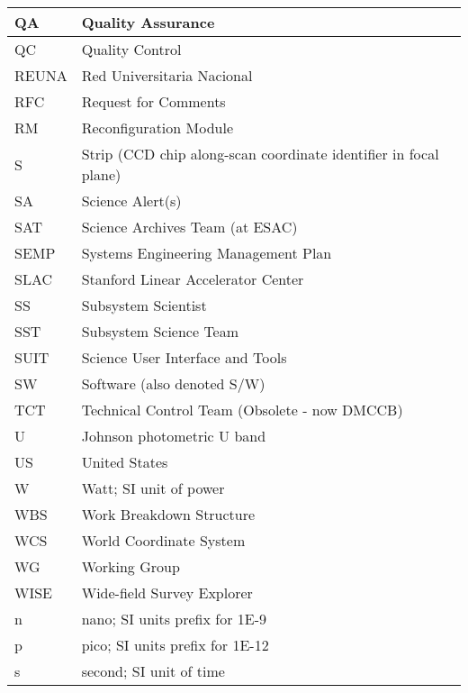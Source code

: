 \begin{longtable}{|l|p{}|}
QA & Quality Assurance \\\hline
QC & Quality Control \\\hline
REUNA & Red Universitaria Nacional \\\hline
RFC & Request for Comments \\\hline
RM & Reconfiguration Module \\\hline
S & Strip (CCD chip along-scan coordinate identifier in focal plane) \\\hline
SA & Science Alert(s) \\\hline
SAT & Science Archives Team (at ESAC) \\\hline
SEMP & Systems Engineering Management Plan \\\hline
SLAC & Stanford Linear Accelerator Center \\\hline
SS & Subsystem Scientist \\\hline
SST & Subsystem Science Team \\\hline
SUIT & Science User Interface and Tools \\\hline
SW & Software (also denoted S/W) \\\hline
TCT & Technical Control Team (Obsolete - now DMCCB) \\\hline
U & Johnson photometric U band \\\hline
US & United States \\\hline
W & Watt; SI unit of power \\\hline
WBS & Work Breakdown Structure \\\hline
WCS & World Coordinate System \\\hline
WG & Working Group \\\hline
WISE & Wide-field Survey Explorer \\\hline
n & nano; SI units prefix for 1E-9 \\\hline
p & pico; SI units prefix for 1E-12 \\\hline
s & second; SI unit of time \\\hline
\end{longtable}

